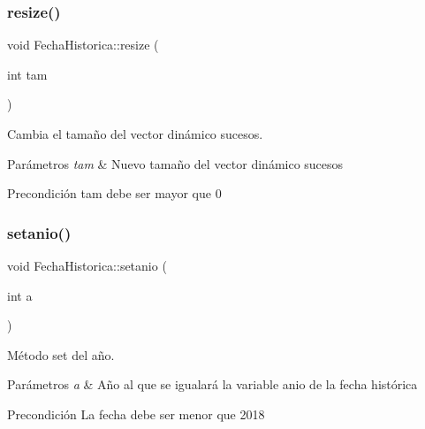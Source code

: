 \subsubsection{\texorpdfstring{resize()}{resize()}}
{\footnotesize\ttfamily void Fecha\+Historica\+::resize (\begin{DoxyParamCaption}\item[{int}]{tam }\end{DoxyParamCaption})\hspace{0.3cm}{\ttfamily [private]}}



Cambia el tamaño del vector dinámico sucesos. 


\begin{DoxyParams}{Parámetros}
{\em tam} & Nuevo tamaño del vector dinámico sucesos \\
\hline
\end{DoxyParams}
\begin{DoxyPrecond}{Precondición}
tam debe ser mayor que 0 
\end{DoxyPrecond}
\mbox{\label{classFechaHistorica_a2b82d1369c122baef3ac53730d4a707e}} 
\subsubsection{\texorpdfstring{setanio()}{setanio()}}
{\footnotesize\ttfamily void Fecha\+Historica\+::setanio (\begin{DoxyParamCaption}\item[{int}]{a }\end{DoxyParamCaption})}



Método set del año. 


\begin{DoxyParams}{Parámetros}
{\em a} & Año al que se igualará la variable anio de la fecha histórica \\
\hline
\end{DoxyParams}
\begin{DoxyPrecond}{Precondición}
La fecha debe ser menor que 2018 
\end{DoxyPrecond}
\mbox{\label{classFechaHistorica_a3e3c2ceca06fa2c982daec425c933568}} 
